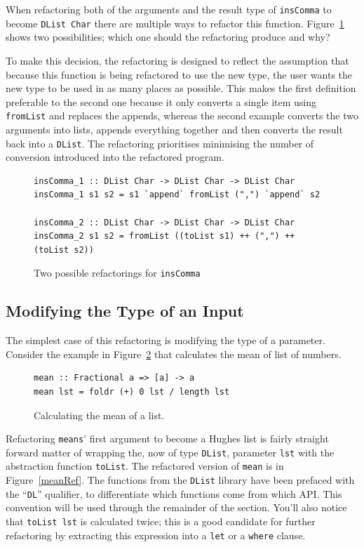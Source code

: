 When refactoring both of the arguments and the result type of \texttt{insComma} to become \texttt{DList Char} there are multiple ways to refactor this function. Figure~\ref{commaRef} shows two possibilities; which one should the refactoring produce and why?

To make this decision, the refactoring is designed to reflect the assumption that because this function is being refactored to use the new type, the user wants the new type to be used in as many places as possible. This makes the first definition preferable to the second one because it only converts a single item using \texttt{fromList} and replaces the appends, whereas the second example converts the two arguments into lists, appends everything together and then converts the result back into a \texttt{DList}. The refactoring prioritises minimising the number of conversion introduced into the refactored program.  

\begin{figure}[t]
\begin{lstlisting}
insComma_1 :: DList Char -> DList Char -> DList Char
insComma_1 s1 s2 = s1 `append` fromList (",") `append` s2

insComma_2 :: DList Char -> DList Char -> DList Char
insComma_2 s1 s2 = fromList ((toList s1) ++ (",") ++ (toList s2))
\end{lstlisting}
\caption{Two possible refactorings for \texttt{insComma}}
\label{commaRef}
\end{figure}

\subsection{Modifying the Type of an Input}

The simplest case of this refactoring is modifying the type of a parameter. Consider the example in Figure~\ref{mean} that calculates the mean of list of numbers. 

\begin{figure}[t]
\begin{lstlisting}
mean :: Fractional a => [a] -> a
mean lst = foldr (+) 0 lst / length lst
\end{lstlisting} 
\caption{Calculating the mean of a list.}
\label{mean}
\end{figure}

Refactoring \texttt{means}' first argument to become a Hughes list is fairly straight forward matter of wrapping the, now of type \texttt{DList}, parameter \texttt{lst} with the abstraction function \texttt{toList}. The refactored version of \texttt{mean} is in Figure~\ref{meanRef}. The functions from the \texttt{DList} library have been prefaced with the ``\texttt{DL}'' qualifier, to differentiate which functions come from which API. This convention will be used through the remainder of the section. You'll also notice that \texttt{toList lst} is calculated twice; this is a good candidate for further refactoring by extracting this expression into a \texttt{let} or a \texttt{where} clause. 

